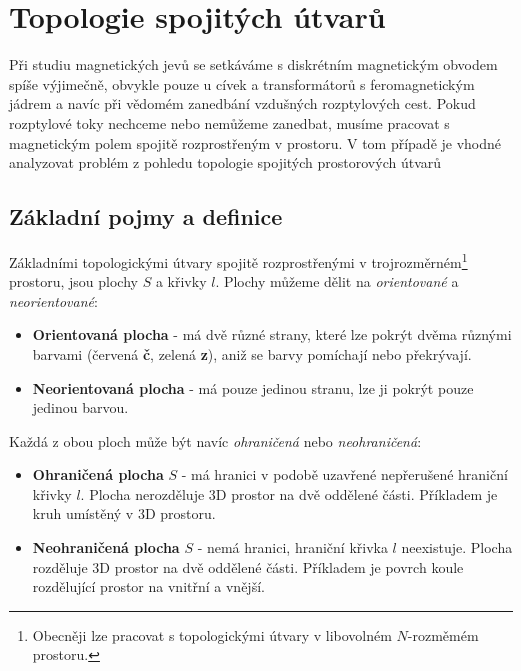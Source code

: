   \section{Topologie spojitých útvarů}\label{teo:IchapIIsecII}
    Při studiu magnetických jevů se setkáváme s diskrétním magnetickým obvodem spíše výjimečně, 
    obvykle pouze u cívek a transformátorů s feromagnetickým jádrem a navíc při vědomém zanedbání 
    vzdušných rozptylových cest. Pokud rozptylové toky nechceme nebo nemůžeme zanedbat, musíme 
    pracovat s magnetickým polem spojitě rozprostřeným v prostoru. V tom případě je vhodné 
    analyzovat problém z pohledu topologie spojitých prostorových útvarů
      
    \subsection{Základní pojmy a definice}\label{teo:IchapIIsecIIsubI}
      Základními topologickými útvary spojitě rozprostřenými v trojrozměrném\footnote{Obecněji lze 
      pracovat s topologickými útvary v libovolném \(N\)-rozměmém prostoru.} prostoru, jsou      
      plochy \(S\) a křivky \(l\). Plochy můžeme dělit na \emph{orientované} a \emph{neorientované}:
      \begin{itemize}\addtolength{\itemsep}{-0.5\baselineskip}
        \item \textbf{Orientovaná plocha} - má dvě různé strany, které lze pokrýt dvěma různými 
               barvami (červená \textbf{č}, zelená \textbf{z}), aniž se barvy pomíchají nebo 
               překrývají.
        \item \textbf{Neorientovaná plocha} - má pouze jedinou stranu, lze ji pokrýt pouze jedinou 
              barvou.
      \end{itemize}
      
      Každá z obou ploch může být navíc \emph{ohraničená} nebo \emph{neohraničená}:
      \begin{itemize}\addtolength{\itemsep}{-0.5\baselineskip}
        \item \textbf{Ohraničená plocha} \(S\) - má hranici v podobě uzavřené nepřerušené hraniční 
             křivky \(l\). Plocha nerozděluje 3D prostor na dvě oddělené části. Příkladem je kruh 
             umístěný v 3D prostoru.
        \item \textbf{Neohraničená plocha} \(S\) - nemá hranici, hraniční křivka \(l\) neexistuje. 
              Plocha rozděluje 3D prostor na dvě oddělené části. Příkladem je povrch koule 
              rozdělující prostor na vnitřní a vnější.
      \end{itemize}
      
